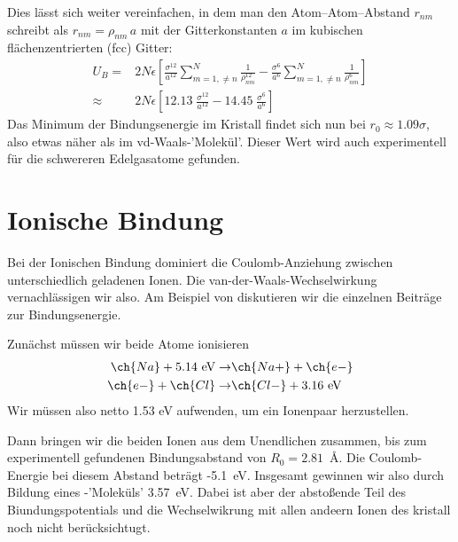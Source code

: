 Dies lässt sich weiter vereinfachen, in dem man den Atom--Atom--Abstand $r_{nm}$ schreibt als $r_{nm} = \rho_{nm} \, a$  mit der Gitterkonstanten $a$ im kubischen flächenzentrierten (fcc) Gitter:
\begin{align}
U_B = & 
2 N \epsilon 
\left[ 
\frac{\sigma^{12}}{a^{12}}
\sum_{m=1,   \neq n}^N  \frac{1}{\rho_{nm}^{12}} 
-
\frac{\sigma^{6}}{a^{6}}
\sum_{m=1,   \neq n}^N  \frac{1}{\rho_{nm}^{6}} 
\right] \\
\approx & 
2 N \epsilon 
\left[ 
12.13 \; \frac{\sigma^{12}}{a^{12}}
-
14.45 \; \frac{\sigma^{6}}{a^{6}}
\right] 
\end{align}
Das Minimum der Bindungsenergie im Kristall findet sich nun bei $r_0 \approx 1.09 \sigma$, also etwas näher als im vd-Waals-'Molekül'. Dieser Wert wird auch experimentell für die schwereren Edelgasatome gefunden.

\section{Ionische Bindung}

Bei der Ionischen Bindung dominiert die Coulomb-Anziehung zwischen unterschiedlich geladenen Ionen. Die van-der-Waals-Wechselwirkung vernachlässigen wir also. Am Beispiel von  diskutieren wir die einzelnen Beiträge zur Bindungsenergie.

Zunächst müssen wir beide Atome ionisieren
\begin{align}
 \ch{Na} + 5.14\text{ eV} \rightarrow  & \ch{Na+} + \ch{e-} \\
  \ch{e-}  + \ch{Cl} \rightarrow  & \ch{Cl-} + 3.16\text{ eV}
\end{align}
Wir müssen also netto 1.53 eV aufwenden, um ein Ionenpaar herzustellen.

Dann bringen wir die beiden Ionen aus dem Unendlichen zusammen, bis zum experimentell gefundenen Bindungsabstand von $R_0 = 2.81$~\AA. Die Coulomb-Energie bei diesem Abstand beträgt -5.1~eV. Insgesamt gewinnen wir also durch Bildung eines -'Moleküls' 3.57~eV. Dabei ist aber der abstoßende Teil des Biundungspotentials und die Wechselwikrung mit allen andeern Ionen des kristall noch nicht berücksichtugt.

